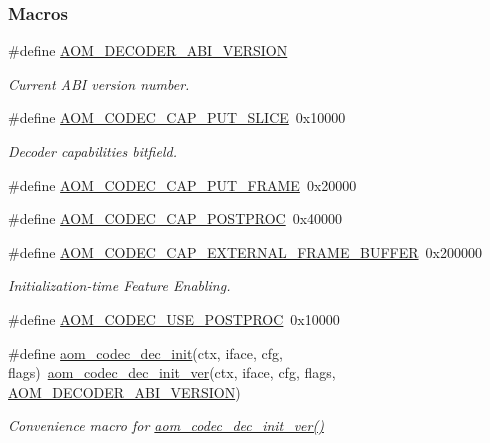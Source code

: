 \subsubsection*{Macros}
\begin{DoxyCompactItemize}
\item 
\mbox{\label{group__decoder_ga23378c7ca8c361c097181aaaa2a5a734}} 
\#define \hyperlink{group__decoder_ga23378c7ca8c361c097181aaaa2a5a734}{A\+O\+M\+\_\+\+D\+E\+C\+O\+D\+E\+R\+\_\+\+A\+B\+I\+\_\+\+V\+E\+R\+S\+I\+ON}
\begin{DoxyCompactList}\small\item\em Current A\+BI version number. \end{DoxyCompactList}\item 
\#define \hyperlink{group__decoder_ga1e50f39bf0434fc5d18aeed80e06d044}{A\+O\+M\+\_\+\+C\+O\+D\+E\+C\+\_\+\+C\+A\+P\+\_\+\+P\+U\+T\+\_\+\+S\+L\+I\+CE}~0x10000
\begin{DoxyCompactList}\small\item\em Decoder capabilities bitfield. \end{DoxyCompactList}\item 
\#define \hyperlink{group__decoder_ga667591ede452c5625fcf9345c66514d5}{A\+O\+M\+\_\+\+C\+O\+D\+E\+C\+\_\+\+C\+A\+P\+\_\+\+P\+U\+T\+\_\+\+F\+R\+A\+ME}~0x20000
\item 
\#define \hyperlink{group__decoder_gabcb476dc9748f64ad4a3718419bffc47}{A\+O\+M\+\_\+\+C\+O\+D\+E\+C\+\_\+\+C\+A\+P\+\_\+\+P\+O\+S\+T\+P\+R\+OC}~0x40000
\item 
\#define \hyperlink{group__decoder_gabd11df9f35d52ea76de2c8d32aa36963}{A\+O\+M\+\_\+\+C\+O\+D\+E\+C\+\_\+\+C\+A\+P\+\_\+\+E\+X\+T\+E\+R\+N\+A\+L\+\_\+\+F\+R\+A\+M\+E\+\_\+\+B\+U\+F\+F\+ER}~0x200000
\begin{DoxyCompactList}\small\item\em Initialization-\/time Feature Enabling. \end{DoxyCompactList}\item 
\#define \hyperlink{group__decoder_ga7b6c145833964c9edd3ff78be017f7ec}{A\+O\+M\+\_\+\+C\+O\+D\+E\+C\+\_\+\+U\+S\+E\+\_\+\+P\+O\+S\+T\+P\+R\+OC}~0x10000
\item 
\#define \hyperlink{group__decoder_gafdbfca65b19ab1f6d72b32cd01753b9b}{aom\+\_\+codec\+\_\+dec\+\_\+init}(ctx,  iface,  cfg,  flags)~\hyperlink{group__decoder_gab2bfd2f5517b9452d2c71b7c2b2e8e8d}{aom\+\_\+codec\+\_\+dec\+\_\+init\+\_\+ver}(ctx, iface, cfg, flags, \hyperlink{group__decoder_ga23378c7ca8c361c097181aaaa2a5a734}{A\+O\+M\+\_\+\+D\+E\+C\+O\+D\+E\+R\+\_\+\+A\+B\+I\+\_\+\+V\+E\+R\+S\+I\+ON})
\begin{DoxyCompactList}\small\item\em Convenience macro for \hyperlink{group__decoder_gab2bfd2f5517b9452d2c71b7c2b2e8e8d}{aom\+\_\+codec\+\_\+dec\+\_\+init\+\_\+ver()} \end{DoxyCompactList}\end{DoxyCompactItemize}

